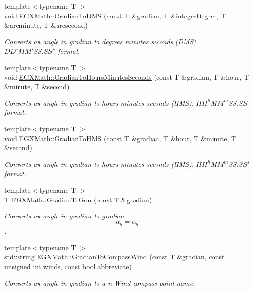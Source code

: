 \begin{DoxyCompactItemize}
{\footnotesize template$<$typename T $>$ }\\void \mbox{\hyperlink{group___e_g_x_math-_angle_conversions-_gradian_ga0b6700b55ab4a24fa581bf2af0dafdaa}{E\+G\+X\+Math\+::\+Gradian\+To\+D\+MS}} (const T \&gradian, T \&integer\+Degree, T \&arcminute, T \&arcsecond)
\begin{DoxyCompactList}\small\item\em Converts an angle in gradian to degrees minutes seconds (D\+MS). ${DD}^{\circ}{MM}'{SS.SS}''$ format. \end{DoxyCompactList}\item 
{\footnotesize template$<$typename T $>$ }\\void \mbox{\hyperlink{group___e_g_x_math-_angle_conversions-_gradian_gaf174cf5b716d5a490b3744ffe9ff3b97}{E\+G\+X\+Math\+::\+Gradian\+To\+Hours\+Minutes\+Seconds}} (const T \&gradian, T \&hour, T \&minute, T \&second)
\begin{DoxyCompactList}\small\item\em Converts an angle in gradian to hours minutes seconds (H\+MS). ${HH}^h{MM}^m{SS.SS}^s$ format. \end{DoxyCompactList}\item 
{\footnotesize template$<$typename T $>$ }\\void \mbox{\hyperlink{group___e_g_x_math-_angle_conversions-_gradian_ga6513a992679fbb97d2969cf8bd68306f}{E\+G\+X\+Math\+::\+Gradian\+To\+H\+MS}} (const T \&gradian, T \&hour, T \&minute, T \&second)
\begin{DoxyCompactList}\small\item\em Converts an angle in gradian to hours minutes seconds (H\+MS). ${HH}^h{MM}^m{SS.SS}^s$ format. \end{DoxyCompactList}\item 
{\footnotesize template$<$typename T $>$ }\\T \mbox{\hyperlink{group___e_g_x_math-_angle_conversions-_gradian_gaff399262b6c8455e450e0a9dc8eb2ad1}{E\+G\+X\+Math\+::\+Gradian\+To\+Gon}} (const T \&gradian)
\begin{DoxyCompactList}\small\item\em Converts an angle in gradian to gradian. \[\alpha_{g}=\alpha_{g}\]. \end{DoxyCompactList}\item 
{\footnotesize template$<$typename T $>$ }\\std\+::string \mbox{\hyperlink{group___e_g_x_math-_angle_conversions-_gradian_ga52ed2e44217e6a57e56829bee36612dc}{E\+G\+X\+Math\+::\+Gradian\+To\+Compass\+Wind}} (const T \&gradian, const unsigned int winds, const bool abbreviate)
\begin{DoxyCompactList}\small\item\em Converts an angle in gradian to a n-\/\+Wind compass point name. \end{DoxyCompactList}\end{DoxyCompactItemize}


